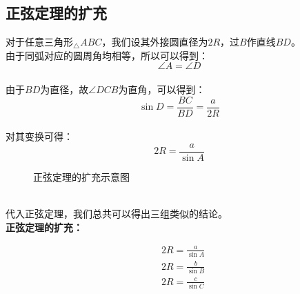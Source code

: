 \documentclass[UTF8]{ctexart}
\begin{document}
\subsection{正弦定理的扩充}
    对于任意三角形$_\triangle ABC$，我们设其外接圆直径为$2R$，过$B$作直线$BD$。\\[3mm]
    由于同弧对应的圆周角均相等，所以可以得到：
    \setcounter{equation}{0}
    \begin{equation}
        \angle{A}=\angle{D}
    \end{equation}\\
    由于$BD$为直径，故$\angle{DCB}$为直角，可以得到：\vspace{5pt}
    \begin{equation}
        \sin{D}=\frac{BC}{BD}=\frac{a}{2R}
    \end{equation}\\
    对其变换可得：
    \begin{equation}
        2R=\frac{a}{\sin{A}}
    \end{equation}
    \begin{figure}[h]
        \begin{center}
            \caption{正弦定理的扩充示意图}
        \end{center}
    \end{figure}\\
    代入正弦定理，我们总共可以得出三组类似的结论。\\[3mm]
    \textbf{正弦定理的扩充：}
    \begin{large}
        \begin{align*}
            &2R=\frac{a}{\sin{A}}\\[3mm]
            &2R=\frac{b}{\sin{B}}\\[3mm]
            &2R=\frac{c}{\sin{C}}
        \end{align*}
    \end{large}
\end{document}
